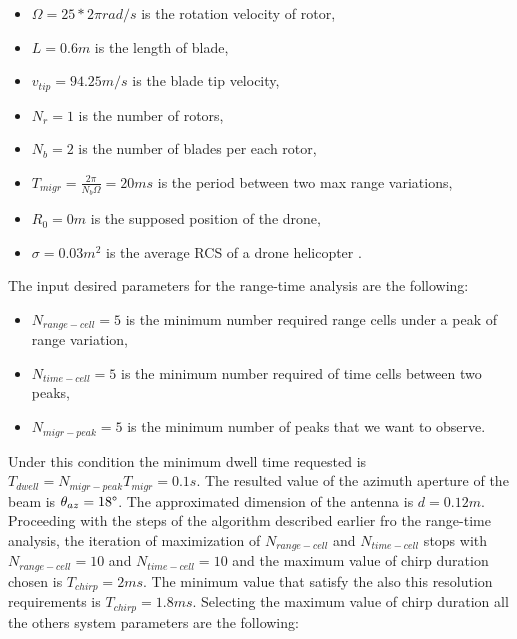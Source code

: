 \begin{itemize}
    
    \item $\Omega = 25*2\pi rad/s$ is the rotation velocity of rotor,
         
    \item $L = 0.6 m$ is the length of blade,

    \item $v_{tip} = 94.25 m/s$ is the blade tip velocity,
    
    \item $N_r = 1$ is the number of rotors,
    
    \item $N_b = 2$ is the number of blades per each rotor,
    
    \item $T_{migr} = \frac{2\pi}{N_b \Omega} = 20 ms$ is the period between two max range variations, 
    
    \item $R_0 = 0m$ is the supposed position of the drone,
    
    \item $\sigma = 0.03 m^{2}$ is the average RCS of a drone helicopter \cite{rcsdrone}.
    
\end{itemize}

The input desired parameters for the range-time analysis are the following:
\begin{itemize}
    
    \item $N_{range-cell} = 5$ is the minimum number required range cells under a peak of range variation,
         
    \item $N_{time-cell} = 5$ is the minimum number required of time cells between two peaks,

    \item $N_{migr-peak} = 5$ is the minimum number of peaks that we want to observe.
    
\end{itemize}

Under this condition the minimum dwell time requested is $T_{dwell} = N_{migr-peak} T_{migr}= 0.1 s$. The resulted value of the azimuth aperture of the beam is $\theta_{az} = 18\degree$. The approximated dimension of the antenna is $d = 0.12m$.\\ Proceeding with the steps of the algorithm described earlier fro the range-time analysis, the iteration of maximization of $N_{range-cell}$ and $N_{time-cell}$ stops with $N_{range-cell} = 10$ and $N_{time-cell} = 10$ and the maximum value of chirp duration chosen is $T_{chirp} = 2 ms$. The minimum value that satisfy the also this resolution requirements is $T_{chirp} = 1.8 ms$. Selecting the maximum value of chirp duration all the others system parameters are the following:

